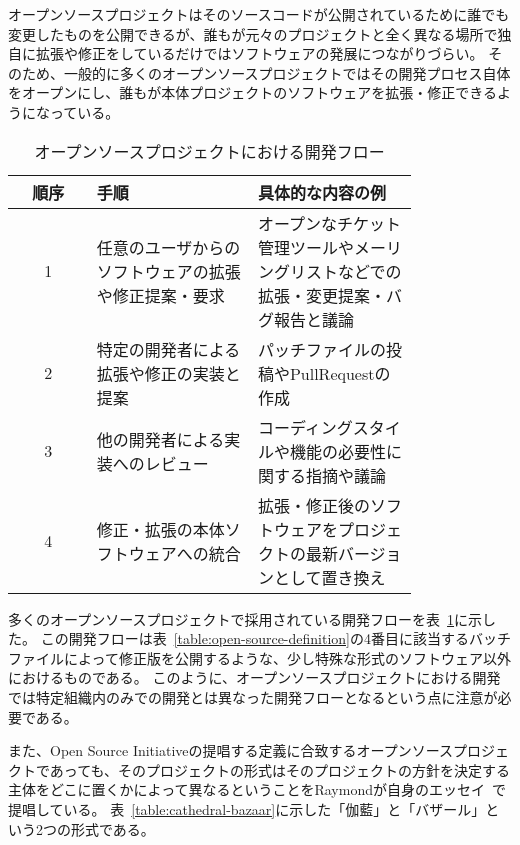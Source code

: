 オープンソースプロジェクトはそのソースコードが公開されているために誰でも変更したものを公開できるが、誰もが元々のプロジェクトと全く異なる場所で独自に拡張や修正をしているだけではソフトウェアの発展につながりづらい。
そのため、一般的に多くのオープンソースプロジェクトではその開発プロセス自体をオープンにし、誰もが本体プロジェクトのソフトウェアを拡張・修正できるようになっている。

\begin{table}[!hbtp]
    \begin{center}
        \caption{オープンソースプロジェクトにおける開発フロー}
        \begin{tabular}{|c|p{0.4\linewidth}|p{0.4\linewidth}|}
            \hline
            順序 & 手順 & 具体的な内容の例 \\
            \hline
            \hline
            1 & 任意のユーザからのソフトウェアの拡張や修正提案・要求 & オープンなチケット管理ツールやメーリングリストなどでの拡張・変更提案・バグ報告と議論 \\
            \hline
            2 & 特定の開発者による拡張や修正の実装と提案 & パッチファイルの投稿やPullRequestの作成 \\
            \hline
            3 & 他の開発者による実装へのレビュー & コーディングスタイルや機能の必要性に関する指摘や議論 \\
            \hline
            4 & 修正・拡張の本体ソフトウェアへの統合 & 拡張・修正後のソフトウェアをプロジェクトの最新バージョンとして置き換え \\
            \hline
        \end{tabular}
        \label{table:open-source-flow}
    \end{center}
\end{table}

多くのオープンソースプロジェクトで採用されている開発フローを表~\ref{table:open-source-flow}に示した。
この開発フローは表~\ref{table:open-source-definition}の4番目に該当するバッチファイルによって修正版を公開するような、少し特殊な形式のソフトウェア以外におけるものである。
このように、オープンソースプロジェクトにおける開発では特定組織内のみでの開発とは異なった開発フローとなるという点に注意が必要である。

また、Open Source Initiativeの提唱する定義に合致するオープンソースプロジェクトであっても、そのプロジェクトの形式はそのプロジェクトの方針を決定する主体をどこに置くかによって異なるということをRaymondが自身のエッセイ~\cite{raymond}で提唱している。
表~\ref{table:cathedral-bazaar}に示した「伽藍」と「バザール」という2つの形式である。

